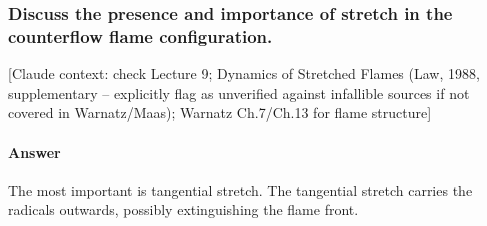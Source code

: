 \subsubsection{Discuss the presence and importance of stretch in the counterflow flame configuration.}

{\color{gray}\footnotesize [Claude context: check Lecture 9; Dynamics of Stretched Flames (Law, 1988, supplementary -- explicitly flag as unverified against infallible sources if not covered in Warnatz/Maas); Warnatz Ch.7/Ch.13 for flame structure]}

\paragraph{Answer} The most important is tangential stretch. The tangential stretch carries the radicals outwards, possibly extinguishing the flame front.

